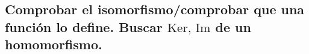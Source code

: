 \subsection{Comprobar el isomorfismo/comprobar que una función lo define. Buscar $\text{Ker, Im}$ de un homomorfismo.}
